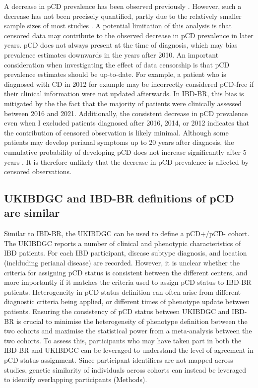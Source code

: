    A decrease in pCD prevalence has been observed previously \cite{Park2019-kj}. However, such a decrease has not been precisely quantified, partly due to the relatively smaller sample sizes of most studies \cite{Brochard2022-kz,Bruckner2018-ag,Gottgens2017-df,Tsai2022-kz}. A potential limitation of this analysis is that censored data may contribute to the observed decrease in pCD prevalence in later years. pCD does not always present at the time of diagnosis, which may bias prevalence estimates downwards in the years after 2010. An important consideration when investigating the effect of data censorship is that pCD prevalence estimates should be up-to-date. For example, a patient who is diagnosed with CD in 2012 for example may be incorrectly considered pCD-free if their clinical information were not updated afterwards. In IBD-BR, this bias is mitigated by the the fact that the majority of patients were clinically assessed between 2016 and 2021. Additionally, the consistent decrease in pCD prevalence even when I excluded patients diagnosed after 2016, 2014, or 2012 indicates that the contribution of censored observation is likely minimal. Although some patients may develop perianal symptoms up to 20 years after diagnosis, the cumulative probability of developing pCD does not increase significantly after 5 years \cite{Tsai2022-kz}. It is therefore unlikely that the decrease in pCD prevalence is affected by censored observations.

    \subsection{UKIBDGC and IBD-BR definitions of pCD are similar}
    Similar to IBD-BR, the UKIBDGC can be used to define a pCD+/pCD- cohort. The UKIBDGC reports a number of clinical and phenotypic characteristics of IBD patients. For each IBD participant, disease subtype diagnosis, and location (inclduding perianal disease) are recorded. However, it is unclear whether the criteria for assigning pCD status is consistent between the different centers, and more importantly if it matches the criteria used to assign pCD status to IBD-BR patients. Heterogeneity in pCD status definition can often arise from different diagnostic criteria being applied, or different times of phenotype update between patients. Ensuring the consistency of pCD status between UKIBDGC and IBD-BR is crucial to minimise the heterogeneity of phenotype definition between the two cohorts and maximise the statistical power from a meta-analysis between the two cohorts. 
To assess this, participants who may have taken part in both the IBD-BR and UKIBDGC can be leveraged to understand the level of agreement in pCD status assignment. Since participant identifiers are not mapped across studies, genetic similarity of individuals across cohorts can instead be leveraged to identify overlapping participants (Methods).\\


